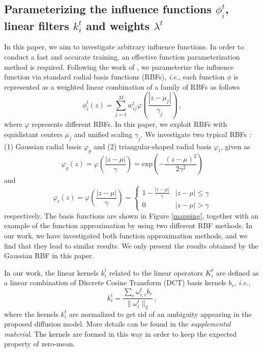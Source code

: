 \documentclass[10pt,journal,compsoc]{IEEEtran}
\newcommand{\suml}[2]{\sum\limits_{#1}^{#2}}
\newcommand{\ie}{\emph{i.e.}}
\begin{document}
\begin{comment}
It should be noted that for the models trained in the greedy manner, 
we can stop the inference at any stage, as its output of each stage is optimized. 
However, for the jointly trained models, we have to run $T$ stages, 
as in this case only the output of the $T^{th}$ stage is optimized. 
\end{comment}
\subsection{Parameterizing the influence functions 
$\phi_i^t$, linear filters $k_i^t$ and weights $\lambda^t$}
In this paper, we aim to investigate arbitrary influence functions. 
In order to conduct a fast and accurate training, an effective 
function parameterization method is required. {
Following the work of \cite{CSF2014}, }
we parameterize the influence function via standard radial basis 
functions (RBFs), \ie, each function $\phi$ is represented as a weighted linear combination of a family of RBFs as follows
\begin{equation}\label{rbf}
\phi_i^t(z) = \suml{j = 1}{M}w_{ij}^t\varphi \left(\frac {|z - \mu_j|}{\gamma_j}\right) \,,
\end{equation}
where $\varphi$ represents different RBFs. 
In this paper, we exploit RBFs with equidistant centers $\mu_j$ and unified scaling $\gamma_j$. 
We investigate two typical RBFs \cite{hu2010handbook}: (1) Gaussian radial basis $\varphi_g$ and 
(2) triangular-shaped radial basis $\varphi_t$, given as 
\[
\varphi_g(z) = \varphi \left(\frac {|z - \mu|}{\gamma}\right)  = 
\text{exp}\left(-\frac {(z - \mu)^2}{2\gamma^2}\right)
\]
and 
\[
\varphi_t(z) = \varphi \left(\frac {|z - \mu|}{\gamma}\right)  = 
\begin{cases}
1 - \frac {|z - \mu|}{\gamma}  & |z - \mu| \leq \gamma\\
0 & |z - \mu| > \gamma
\end{cases}
\]
respectively. The basis functions are shown in Figure \ref{mapping}, together with an example of the function approximation 
by using two different RBF methods. 
In our work, we have investigated both function approximation methods, and we find that 
they lead to similar results. 
We only present the results obtained by the Gaussian RBF in this paper. 


In our work, the linear kernels $k_i^t$ related to the linear operators $K_i^t$ are 
defined as a linear combination of Discrete Cosine Transform (DCT) basis kernels 
$b_r$, \ie, 
\[
k_i^t = \frac{\sum\nolimits_{r}\omega_{i,r}^t b_r}{\|\omega_i^t\|_2}\,,
\]
where the kernels $k_i^t$ are normalized to get rid of an ambiguity appearing 
in the proposed diffusion model. 
More details can be found in the \textit{supplemental material}. 
The kernels are formed in this way in order to keep the expected property of 
zero-mean. 
\end{document}
